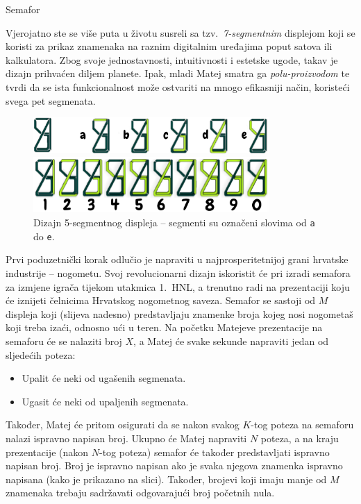 \begin{statement}[
  problempoints=100,
  timelimit=1 sekunda,
  memorylimit=512 MiB,
]{Semafor}

Vjerojatno ste se više puta u životu susreli sa tzv.\ \textit{7-segmentnim}
displejom koji se koristi za prikaz znamenaka na raznim digitalnim uređajima
poput satova ili kalkulatora. Zbog svoje jednostavnosti, intuitivnosti i
estetske ugode, takav je dizajn prihvaćen diljem planete.  Ipak, mladi Matej
smatra ga \textit{polu-proizvodom} te tvrdi da se ista funkcionalnost može
ostvariti na mnogo efikasniji način, koristeći svega pet segmenata.

\begin{figure}[H]
  \begin{center}
    \includegraphics[width=0.8\textwidth]{img/5segment.png}

    \vspace{0.5cm}

    \includegraphics[width=0.8\textwidth]{img/5segmentdigits.png}
    \caption*{Dizajn 5-segmentnog displeja -- segmenti su označeni slovima od \texttt{a} do \texttt{e}.}
  \end{center}
\end{figure}
  \vspace{-0.7cm}
Prvi poduzetnički korak odlučio je napraviti u najprosperitetnijoj grani
hrvatske industrije -- nogometu. Svoj revolucionarni dizajn iskoristit će pri
izradi semafora za izmjene igrača tijekom utakmica 1.\ HNL, a trenutno radi
na prezentaciji koju će iznijeti čelnicima Hrvatskog nogometnog saveza.
Semafor se sastoji od $M$ displeja koji (slijeva nadesno) predstavljaju
znamenke broja kojeg nosi nogometaš koji treba izaći, odnosno ući u teren.
Na početku Matejeve prezentacije na semaforu će se nalaziti broj $X$, a Matej
će svake sekunde napraviti jedan od sljedećih poteza:
  \begin{itemize}
      \item Upalit će neki od ugašenih segmenata.
      \item Ugasit će neki od upaljenih segmenata.
  \end{itemize}
Također, Matej će pritom osigurati da se nakon svakog $K$-tog poteza na semaforu
nalazi ispravno napisan broj. Ukupno će Matej napraviti $N$ poteza, a na kraju
prezentacije (nakon $N$-tog poteza) semafor će također predstavljati ispravno
napisan broj. Broj je ispravno napisan ako je svaka njegova znamenka ispravno
napisana (kako je prikazano na slici). Također, brojevi koji imaju manje od
$M$ znamenaka trebaju sadržavati odgovarajući broj početnih nula.


\end{statement}
